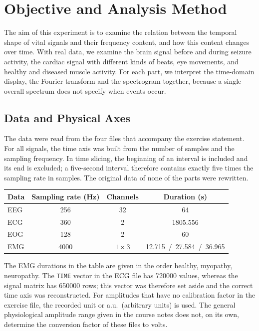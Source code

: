 \section{Objective and Analysis Method}

The aim of this experiment is to examine the relation between the temporal shape of vital signals and their frequency content, and how this content changes over time. With real data, we examine the brain signal before and during seizure activity, the cardiac signal with different kinds of beats, eye movements, and healthy and diseased muscle activity. For each part, we interpret the time-domain display, the Fourier transform and the spectrogram together, because a single overall spectrum does not specify when events occur.

\subsection{Data and Physical Axes}

The data were read from the four files that accompany the exercise statement. For all signals, the time axis was built from the number of samples and the sampling frequency. In time slicing, the beginning of an interval is included and its end is excluded; a five-second interval therefore contains exactly five times the sampling rate in samples. The original data of none of the parts were rewritten.

\begin{center}
\begin{tabular}{@{}lccc@{}}
\toprule
\textbf{Data} & \textbf{Sampling rate (Hz)} & \textbf{Channels} & \textbf{Duration (s)}\\
\midrule
EEG & 256  & 32 & 64\\
ECG & 360  & 2  & 1805.556\\
EOG & 128  & 2  & 60\\
EMG & 4000 & $1\times3$ & 12.715\ /\ 27.584\ /\ 36.965\\
\bottomrule
\end{tabular}
\end{center}

The EMG durations in the table are given in the order healthy, myopathy, neuropathy. The \texttt{TIME} vector in the ECG file has 720000 values, whereas the signal matrix has 650000 rows; this vector was therefore set aside and the correct time axis was reconstructed. For amplitudes that have no calibration factor in the exercise file, the recorded unit or a.u.\ (arbitrary units) is used. The general physiological amplitude range given in the course notes does not, on its own, determine the conversion factor of these files to volts.

